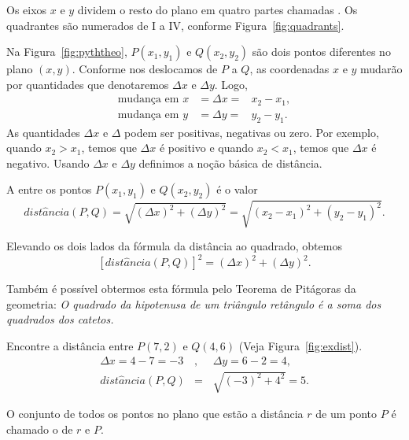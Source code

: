 Os eixos $x$ e $y$ dividem o resto do plano em quatro partes chamadas
. Os quadrantes são numerados de I a IV, conforme
Figura~\ref{fig:quadrants}.

Na Figura~\ref{fig:pyththeo}, $P(x_1, y_1)$ e $Q(x_2, y_2)$ são dois
pontos diferentes no plano $(x, y)$. Conforme nos deslocamos de $P$
a $Q$, as coordenadas $x$ e $y$ mudarão por quantidades que
denotaremos $\Delta x$ e $\Delta y$. Logo,
\begin{eqnarray*}
\text{mudança em } x & = \Delta x = & x_2 - x_1, \\
\text{mudança em } y & = \Delta y = & y_2 - y_1.
\end{eqnarray*}
As quantidades $\Delta x$ e $\Delta$ podem ser positivas, negativas ou
zero. Por exemplo, quando $x_2 > x_1$, temos que $\Delta x$ é positivo
e quando $x_2 < x_1$, temos que $\Delta x$ é negativo. Usando $\Delta x$
e $\Delta y$ definimos a noção básica de distância.


\begin{defin}
A  entre os pontos $P(x_1, y_1)$ e $Q(x_2, y_2)$ é
o valor
\[
  dist\hat{a}ncia(P, Q) = \sqrt{(\Delta x)^2 + (\Delta y)^2}
                        = \sqrt{(x_2 - x_1)^2 + (y_2 - y_1)^2}.
\]
\end{defin}

Elevando os dois lados da fórmula da distância ao quadrado, obtemos
\[
  [dist\hat{a}ncia(P, Q)]^2 = (\Delta x)^2 + (\Delta y)^2.
\]

Também é possível obtermos esta fórmula pelo Teorema de Pitágoras
da geometria: \emph{O quadrado da hipotenusa de um triângulo
retângulo é a soma dos quadrados dos catetos.}

\begin{example}
\label{ex:distance}
Encontre a distância entre $P(7, 2)$ e $Q(4, 6)$
(Veja Figura~\ref{fig:exdist}).
\begin{eqnarray*}
\Delta x = 4 - 7 = -3 &,\phantom{,} & \Delta y = 6 - 2 = 4, \\
 dist\hat{a}ncia(P, Q) & =           & \sqrt{(-3)^2 + 4^2} = 5.
\end{eqnarray*}
\end{example}


\begin{defin}[círculo]
O conjunto de todos os pontos no plano que estão a distância $r$ de um ponto
$P$ é chamado o  de  $r$ e  $P$.
\end{defin}

